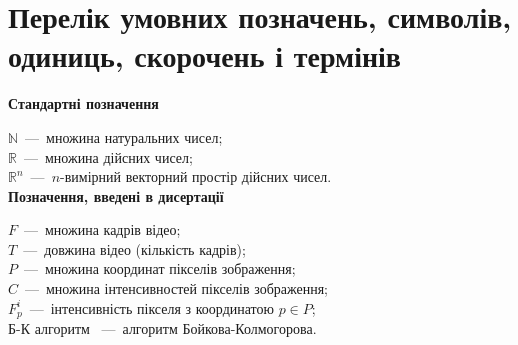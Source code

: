 \chapter*{Перелік умовних позначень, символів, одиниць, скорочень і термінів}

\textbf{Стандартні позначення}

\noindent$\mathbb{N}$~---~множина натуральних чисел; \\
\noindent$\mathbb{R}$~---~множина дійсних чисел; \\
\noindent$\mathbb{R}^n$~---~$n$-вимірний векторний простір дійсних чисел. \\

\textbf{Позначення, введені в дисертації}

\noindent$F$~---~множина кадрів відео; \\
\noindent$T$~---~довжина відео (кількість кадрів); \\
\noindent$P$~---~множина координат пікселів зображення; \\
\noindent$C$~---~множина інтенсивностей пікселів зображення; \\
\noindent$F_p^i$~---~інтенсивність пікселя з координатою $p \in P$; \\
Б-К алгоритм ~---~алгоритм Бойкова-Колмогорова. \\
